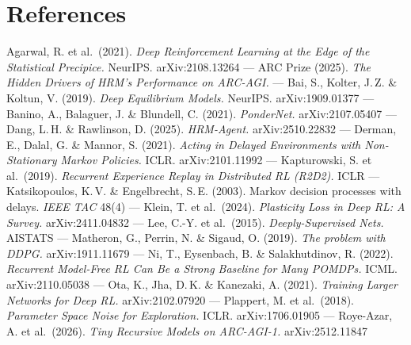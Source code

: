 \documentclass[11pt]{article}
\begin{document}
\section*{References}
\small\RaggedRight
Agarwal, R. et al.\ (2021). \emph{Deep Reinforcement Learning at the Edge of the Statistical Precipice.} NeurIPS. arXiv:2108.13264 ---
ARC Prize (2025). \emph{The Hidden Drivers of HRM's Performance on ARC-AGI.} ---
Bai, S., Kolter, J.\,Z. \& Koltun, V. (2019). \emph{Deep Equilibrium Models.} NeurIPS. arXiv:1909.01377 ---
Banino, A., Balaguer, J. \& Blundell, C. (2021). \emph{PonderNet.} arXiv:2107.05407 ---
Dang, L.\,H. \& Rawlinson, D. (2025). \emph{HRM-Agent.} arXiv:2510.22832 ---
Derman, E., Dalal, G. \& Mannor, S. (2021). \emph{Acting in Delayed Environments with Non-Stationary Markov Policies.} ICLR. arXiv:2101.11992 ---
Kapturowski, S. et al.\ (2019). \emph{Recurrent Experience Replay in Distributed RL (R2D2).} ICLR ---
Katsikopoulos, K.\,V. \& Engelbrecht, S.\,E. (2003). Markov decision processes with delays. \emph{IEEE TAC} 48(4) ---
Klein, T. et al.\ (2024). \emph{Plasticity Loss in Deep RL: A Survey.} arXiv:2411.04832 ---
Lee, C.-Y. et al.\ (2015). \emph{Deeply-Supervised Nets.} AISTATS ---
Matheron, G., Perrin, N. \& Sigaud, O. (2019). \emph{The problem with DDPG.} arXiv:1911.11679 ---
Ni, T., Eysenbach, B. \& Salakhutdinov, R. (2022). \emph{Recurrent Model-Free RL Can Be a Strong Baseline for Many POMDPs.} ICML. arXiv:2110.05038 ---
Ota, K., Jha, D.\,K. \& Kanezaki, A. (2021). \emph{Training Larger Networks for Deep RL.} arXiv:2102.07920 ---
Plappert, M. et al.\ (2018). \emph{Parameter Space Noise for Exploration.} ICLR. arXiv:1706.01905 ---
Roye-Azar, A. et al.\ (2026). \emph{Tiny Recursive Models on ARC-AGI-1.} arXiv:2512.11847
\end{document}
